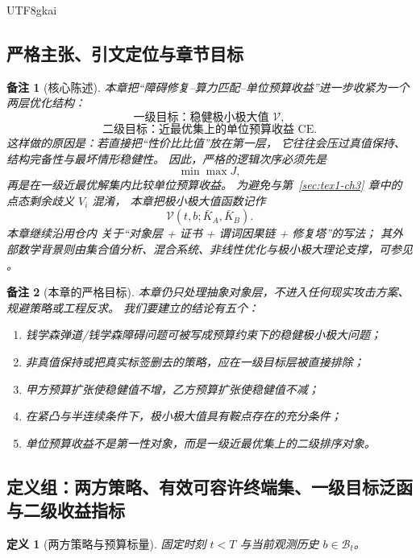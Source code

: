 \documentclass[12pt]{article}
\newtheorem{definition}{定义}[section]
\newtheorem{remark}{备注}[section]
\begin{document}
\begin{CJK*}{UTF8}{gkai}
\subsection{严格主张、引文定位与章节目标}
\label{subsec:tex1-ch4-claim}

\begin{remark}[核心陈述]
本章把“障碍修复--算力匹配--单位预算收益”进一步收紧为一个两层优化结构：
\[
  \text{一级目标：稳健极小极大值 }\mathcal V,
\]
\[
  \text{二级目标：近最优集上的单位预算收益 }\mathrm{CE}.
\]
这样做的原因是：若直接把“性价比比值”放在第一层，
它往往会压过真值保持、结构完备性与最坏情形稳健性。
因此，严格的逻辑次序必须先是
\[
  \min\max J,
\]
再是在一级近最优解集内比较单位预算收益。
为避免与第~\ref{sec:tex1-ch3} 章中的点态剩余歧义 $V_i$ 混淆，
本章把极小极大值函数记作
\[
  \mathcal V(t,b;\bar K_A,\bar K_B).
\]
本章继续沿用仓内
\cite{RepoTex17EdgeOperator,RepoTex18HomotopyAxiom,RepoTex29RepairableObstruction,RepoTex38JacobiBianchiRepair,
  RepoTex43OpenHeterogeneous}
关于“对象层 + 证书 + 谓词因果链 + 修复塔”的写法；
其外部数学背景则由集合值分析、混合系统、非线性优化与极小极大理论支撑，可参见
\cite{AubinFrankowska2009SetValued,Liberzon2003Switching,Sion1958Minimax,Bertsekas2016NonlinearProgramming}。
\end{remark}

\begin{remark}[本章的严格目标]
本章仍只处理抽象对象层，不进入任何现实攻击方案、规避策略或工程反求。
我们要建立的结论有五个：
\begin{enumerate}
  \item 钱学森弹道/钱学森障碍问题可被写成预算约束下的稳健极小极大问题；
  \item 非真值保持或把真实标签删去的策略，应在一级目标层被直接排除；
  \item 甲方预算扩张使稳健值不增，乙方预算扩张使稳健值不减；
  \item 在紧凸与半连续条件下，极小极大值具有鞍点存在的充分条件；
  \item 单位预算收益不是第一性对象，而是一级近最优集上的二级排序对象。
\end{enumerate}
\end{remark}

\subsection{定义组：两方策略、有效可容许终端集、一级目标泛函与二级收益指标}
\label{subsec:tex1-ch4-defs}

\begin{definition}[两方策略与预算标量]
\label{def:tex1-ch4-strategy}
固定时刻 $t<T$ 与当前观测历史 $b\in\mathcal B_t$。


\end{definition}
\end{CJK*}
\end{document}

